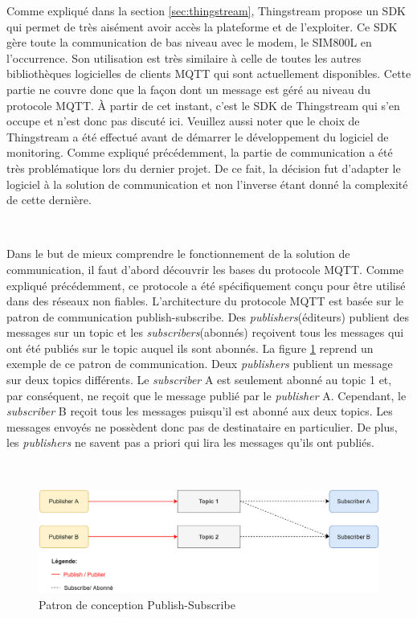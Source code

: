 \noindent
Comme expliqué dans la section \ref{sec:thingstream}, Thingstream propose un SDK qui permet de très aisément avoir accès la plateforme et de l'exploiter. Ce SDK gère toute la communication de bas niveau avec le modem, le SIM800L en l'occurrence. Son utilisation est très similaire à celle de toutes les autres bibliothèques logicielles de clients MQTT qui sont actuellement disponibles. Cette partie ne couvre donc que la façon dont un message est géré au niveau du protocole MQTT. À partir de cet instant, c'est le SDK de Thingstream qui s'en occupe et n'est donc pas discuté ici. Veuillez aussi noter que le choix de Thingstream a été effectué avant de démarrer le développement du logiciel de monitoring. Comme expliqué précédemment, la partie de communication a été très problématique lors du dernier projet. De ce fait, la décision fut d'adapter le logiciel à la solution de communication et non l'inverse étant donné la complexité de cette dernière.

~

\noindent
Dans le but de mieux comprendre le fonctionnement de la solution de communication, il faut d'abord découvrir les bases du protocole MQTT. Comme expliqué précédemment, ce protocole a été spécifiquement conçu pour être utilisé dans des réseaux non fiables. L'architecture du protocole MQTT est basée sur le patron de communication publish-subscribe. Des \textit{publishers}(éditeurs) publient des messages sur un topic et les \textit{subscribers}(abonnés) reçoivent tous les messages qui ont été publiés sur le topic auquel ils sont abonnés.  La figure \ref{fig:pub_sub} reprend un exemple de ce patron de communication. Deux \textit{publishers} publient un message sur deux topics différents. Le \textit{subscriber} A est seulement abonné au topic 1 et, par conséquent, ne reçoit que le message publié par le \textit{publisher} A. Cependant, le \textit{subscriber} B reçoit tous les messages puisqu'il est abonné aux deux topics. Les messages envoyés ne possèdent donc pas de destinataire en particulier. De plus, les \textit{publishers} ne savent pas a priori qui lira les messages qu'ils ont publiés.

~

\begin{figure}[ht!]
  \includegraphics[width=\textwidth]{img/app/pub_sub.png}
  \caption{Patron de conception Publish-Subscribe}
  \label{fig:pub_sub}
\end{figure}



